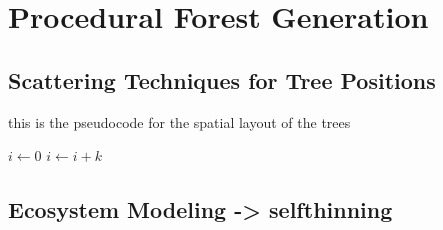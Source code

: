 \documentclass{article}
\newcommand{\desc}[1]{\textcolor{lightblue}{\textbf{\newline description: }\it{#1} \newline}}
\begin{document}


\section{Procedural Forest Generation}


\subsection{Scattering Techniques for Tree Positions}


\begin{algorithm}

\caption{this is the pseudocode for the spatial layout of the trees}
\begin{algorithmic}
        \STATE $i\gets 0$
\ELSE
                \STATE $i\gets i+k$
        \ENDIF
\ENDIF 
\end{algorithmic}

\end{algorithm}

\subsection{Ecosystem Modeling -> selfthinning}
\end{document}
